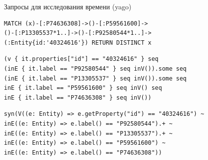 \documentclass[aspectratio=169]{beamer}
\begin{document}
\begin{frame}[fragile]{Запросы для исследования времени (yago)}
  \begin{verbatim}
MATCH (x)-[:P74636308]->()-[:P59561600]->
()-[:P13305537*1..]->()-[:P92580544*1..]->
(:Entity{id:'40324616'}) RETURN DISTINCT x
\end{verbatim}

  \begin{verbatim}
(v { it.properties["id"] == "40324616" } seq
(inE { it.label == "P92580544" } seq inV()).some seq
(inE { it.label == "P13305537" } seq inV()).some seq
inE { it.label == "P59561600" } seq inV() seq
inE { it.label == "P74636308" } seq inV())
\end{verbatim}

  \begin{verbatim}
syn(V((e: Entity) => e.getProperty("id") == "40324616") ~
inE((e: Entity) => e.label() == "P92580544").+ ~
inE((e: Entity) => e.label() == "P13305537").+ ~
inE((e: Entity) => e.label() == "P59561600") ~
inE((e: Entity) => e.label() == "P74636308"))
  \end{verbatim}

\end{frame}
\end{document}
